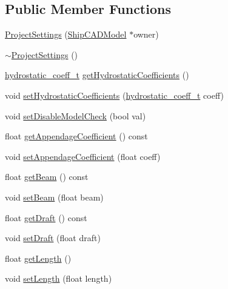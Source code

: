 \subsection*{Public Member Functions}
\begin{DoxyCompactItemize}
\item 
\hyperlink{classShipCAD_1_1ProjectSettings_a55001252531c21f4ccc89d8df9c6b184}{Project\-Settings} (\hyperlink{classShipCAD_1_1ShipCADModel}{Ship\-C\-A\-D\-Model} $\ast$owner)
\item 
\hyperlink{classShipCAD_1_1ProjectSettings_a4c74ba587e58e538083072285937aa4c}{$\sim$\-Project\-Settings} ()
\item 
\hyperlink{namespaceShipCAD_a9cf77f0900561de9efc572dcbad4dbbd}{hydrostatic\-\_\-coeff\-\_\-t} \hyperlink{classShipCAD_1_1ProjectSettings_aef0458c7bfa6e484a155e78eca0d0202}{get\-Hydrostatic\-Coefficients} ()
\item 
void \hyperlink{classShipCAD_1_1ProjectSettings_ab729e778076b560d876f09955212256d}{set\-Hydrostatic\-Coefficients} (\hyperlink{namespaceShipCAD_a9cf77f0900561de9efc572dcbad4dbbd}{hydrostatic\-\_\-coeff\-\_\-t} coeff)
\item 
void \hyperlink{classShipCAD_1_1ProjectSettings_ab9f9f88bba11a2093204affd18df17ab}{set\-Disable\-Model\-Check} (bool val)
\item 
float \hyperlink{classShipCAD_1_1ProjectSettings_a13b2f490e08d61b09a59d2d5008dba47}{get\-Appendage\-Coefficient} () const 
\item 
void \hyperlink{classShipCAD_1_1ProjectSettings_a31fdcc5990fb3c61161fe783b5ed4939}{set\-Appendage\-Coefficient} (float coeff)
\item 
float \hyperlink{classShipCAD_1_1ProjectSettings_ad96c7b5dca9156a767dde327cf5b55c1}{get\-Beam} () const 
\item 
void \hyperlink{classShipCAD_1_1ProjectSettings_ac90d2a093ae0af951fd117d7f6981e92}{set\-Beam} (float beam)
\item 
float \hyperlink{classShipCAD_1_1ProjectSettings_a0fe6c2dde04c7172c334736516950b51}{get\-Draft} () const 
\item 
void \hyperlink{classShipCAD_1_1ProjectSettings_a16a64f2a4a9b6359ac46b0a85f90a4ae}{set\-Draft} (float draft)
\item 
float \hyperlink{classShipCAD_1_1ProjectSettings_a989e357d35af68ac2da9b0e760926308}{get\-Length} ()
\item 
void \hyperlink{classShipCAD_1_1ProjectSettings_aad72cb11575e7a1ae0cda2c50f8de2ad}{set\-Length} (float length)
\item 

\end{DoxyCompactItemize}
